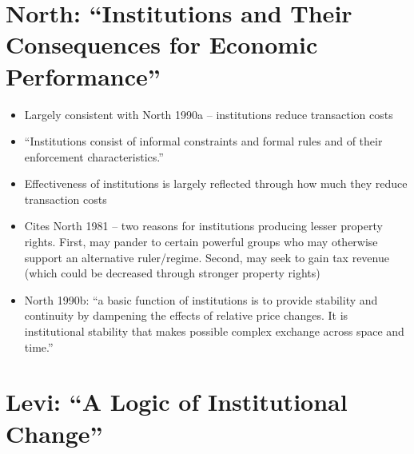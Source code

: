 \documentclass[12pt]{article}
\begin{document}
\section{North: ``Institutions and Their Consequences for Economic Performance''}

\begin{itemize}
    \item Largely consistent with North 1990a -- institutions reduce transaction costs
    \item ``Institutions consist of informal constraints and formal rules and of their enforcement characteristics.''
    \item Effectiveness of institutions is largely reflected through how much they reduce transaction costs
    \item Cites North 1981 -- two reasons for institutions producing lesser property rights. First, may pander to certain powerful groups who may otherwise support an alternative ruler/regime. Second, may seek to gain tax revenue (which could be decreased through stronger property rights)
    \item North 1990b: ``a basic function of institutions is to provide stability and continuity by dampening the effects of relative price changes. It is institutional stability that makes possible complex exchange across space and time.''
\end{itemize}


\section{Levi: ``A Logic of Institutional Change''}
\end{document}
